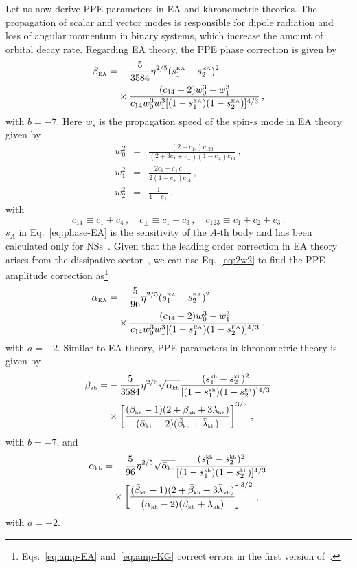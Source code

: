 \documentclass[prd,twocolumn,nofootinbib]{revtex4-1}
\newcommand\be{\begin{equation}}
\newcommand\ba{\begin{eqnarray}}
\newcommand\ee{\end{equation}}
\newcommand\ea{\end{eqnarray}}
\newcommand{\KG}{{\mbox{\tiny kh}}}
\newcommand{\EA}{{\mbox{\tiny EA}}}
\begin{document}
 

Let us now derive PPE parameters in EA and khronometric theories. The propagation of scalar and vector modes is responsible for dipole radiation and loss of angular momentum in binary systems, which increase the amount of orbital decay rate. 
Regarding EA theory, the PPE phase correction is given by~\cite{Hansen:2014ewa} 
 \begin{align}
 \label{eq:phase-EA}
 \beta_{\EA}=&-\frac{5}{3584}\eta ^{2/5} (s_1^\EA-s_2^\EA)^2\nonumber\\
 & \times \frac{(c_{14}-2) w_0^3-w_1^3}{c_{14} w_0^3 w_1^3 [(1-s_1^\EA) (1-s_2^\EA)]^{4/3}}\,,
 \end{align}
with $b=-7$. Here $w_s$ is the propagation speed of the spin-$s$ mode in EA theory given by~\cite{Jacobson:2008aj}  
\ba \label{eq:Prop_Speed_EA_1}
w_0^2 &=& \frac{(2-c_{14}) c_{123}}{(2+3c_2+c_{+}) (1-c_{+}) c_{14}}\,, \\ \label{eq:Prop_Speed_EA_2}
w_1^2 &=& \frac{2 c_1 - c_{+} c_{-}}{2(1-c_{+}) c_{14}}\,, \\  \label{eq:Prop_Speed_EA_3}
w_2^2 &=& \frac{1}{1 - c_+}\,,
\ea
with
\be
c_{14}\equiv c_1+c_4\,, \quad c_{\pm} \equiv c_1 \pm c_3\,, \quad c_{123} \equiv c_1 + c_2 + c_3\,. 
\ee
$s_A$ in Eq.~\eqref{eq:phase-EA} is the sensitivity of the $A$-th body and has been calculated only for NSs~\cite{Yagi:2013ava,Yagi:2013qpa}.
Given that the leading order correction in EA theory arises from the dissipative sector~\cite{Hansen:2014ewa}, we can use Eq.~\eqref{eq:2w2} to find the PPE amplitude correction as\footnote{Eqs.~\eqref{eq:amp-EA} and~\eqref{eq:amp-KG} correct errors in the first version of~\cite{Hansen:2014ewa}.}
 \begin{align}
 \label{eq:amp-EA}
 \alpha_{\EA}=&-\frac{5}{96}\eta ^{2/5} (s_1^\EA-s_2^\EA)^2 \nonumber\\
 & \times  \frac{(c_{14}-2) w_0^3-w_1^3}{c_{14} w_0^3 w_1^3 [ (1-s_1^\EA) (1-s_2^\EA)]^{4/3}}\,,
 \end{align}
 with $a=-2$.  Similar to EA theory, PPE parameters in khronometric theory is given by~\cite{Hansen:2014ewa}
 \begin{align}
 \beta_{\KG}=&-\frac{5}{3584}\eta ^{2/5}\sqrt{\bar \alpha_{\KG}}\frac{(s_1^\KG-s_2^\KG)^2}{[(1-s_1^\KG) (1-s_2^\KG)]^{4/3}} \nonumber\\
 & \times \left[\frac{(\bar \beta_{\KG}-1)(2+\bar \beta_{\KG}+3\bar \lambda_{\KG})}{(\bar \alpha_{\KG}-2)(\bar \beta_{\KG}+\bar \lambda_{\KG})}\right]^{3/2}\,,
 \end{align}
 with $b=-7$, and
 \begin{align}
 \label{eq:amp-KG}
 \alpha_{\KG}=&-\frac{5}{96} \eta ^{2/5}\sqrt{\bar \alpha_{\KG}}\frac{(s_1^\KG-s_2^\KG)^2}{[(1-s_1^\KG) (1-s_2^\KG)]^{4/3}} \nonumber\\
 & \times \left[\frac{(\bar \beta_{\KG}-1)(2+\bar \beta_{\KG}+3\bar \lambda_{\KG})}{(\bar \alpha_{\KG}-2)(\bar \beta_{\KG}+\bar \lambda_{\KG})}\right]^{3/2}\,,
 \end{align}
 with $a=-2$.
 
\end{document}

